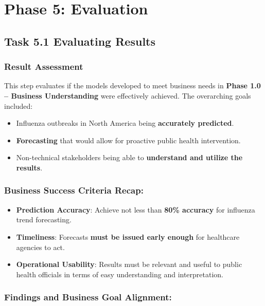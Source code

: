 \section*{Phase 5: Evaluation}

\subsection*{Task 5.1 Evaluating Results}

\subsubsection*{Result Assessment}

This step evaluates if the models developed to meet business needs in \textbf{Phase 1.0 -- Business Understanding} were effectively achieved. The overarching goals included:
\begin{itemize}
  \item Influenza outbreaks in North America being \textbf{accurately predicted}.
  \item \textbf{Forecasting} that would allow for proactive public health intervention.
  \item Non-technical stakeholders being able to \textbf{understand and utilize the results}.
\end{itemize}

\subsubsection*{Business Success Criteria Recap:}
\begin{itemize}
  \item \textbf{Prediction Accuracy}: Achieve not less than \textbf{80\% accuracy} for influenza trend forecasting.
  \item \textbf{Timeliness}: Forecasts \textbf{must be issued early enough} for healthcare agencies to act.
  \item \textbf{Operational Usability}: Results must be relevant and useful to public health officials in terms of easy understanding and interpretation.
\end{itemize}

\subsubsection*{Findings and Business Goal Alignment:}

